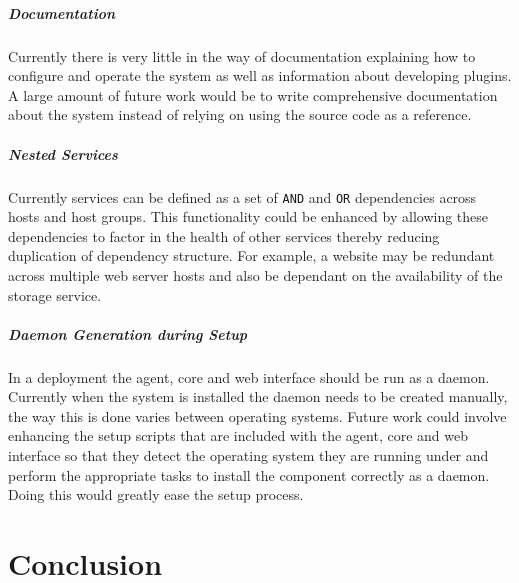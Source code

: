 \documentclass[bsc,logo,twoside,parskip,singlespacing,notimes]{infthesis}
\begin{document}
\paragraph*{Documentation}
	Currently there is very little in the way of documentation explaining how to
	configure and operate the system as well as information about developing
	plugins.  A large amount of future work would be to write comprehensive
	documentation about the system instead of relying on using the source code as a
	reference.

\paragraph*{Nested Services}
	Currently services can be defined as a set of \texttt{AND} and \texttt{OR}
	dependencies across hosts and host groups.  This functionality could be
 	enhanced by allowing these dependencies to factor in the health of other
 	services thereby reducing duplication of dependency structure.  For example,
 	a website may be redundant across multiple web server hosts and also be
 	dependant on the availability of the storage service.

\paragraph*{Daemon Generation during Setup}
	In a deployment the agent, core and web interface should be run as a daemon.
	Currently when the system is installed the daemon needs to be created manually,
	the way this is done varies between operating systems. Future work could
	involve enhancing the setup scripts that are included with the agent, core and
	web interface so that they detect the operating system they are running under
	and perform the appropriate tasks to install the component correctly as a
	daemon.  Doing this would greatly ease the setup process.


\chapter{Conclusion}
\end{document}
